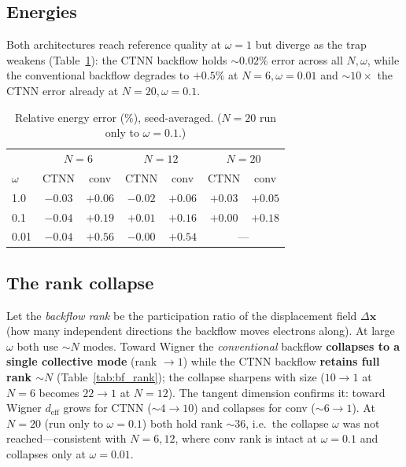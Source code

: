 \subsection{Energies}
Both architectures reach reference quality at $\omega=1$ but diverge as the trap
weakens (Table~\ref{tab:bf_energies}): the CTNN backflow holds $\sim\!0.02\%$
error across all $N,\omega$, while the conventional backflow degrades to $+0.5\%$
at $N=6,\omega=0.01$ and $\sim\!10\times$ the CTNN error already at $N=20,
\omega=0.1$.

\begin{table}[htbp]\centering
\caption{Relative energy error (\%), seed-averaged. ($N=20$ run only to
$\omega=0.1$.)}
\label{tab:bf_energies}
\begin{tabular}{l|cc|cc|cc}
\hline
 & \multicolumn{2}{c|}{$N=6$} & \multicolumn{2}{c|}{$N=12$} & \multicolumn{2}{c}{$N=20$}\\
$\omega$ & CTNN & conv & CTNN & conv & CTNN & conv \\
\hline
1.0  & $-0.03$ & $+0.06$ & $-0.02$ & $+0.06$ & $+0.03$ & $+0.05$ \\
0.1  & $-0.04$ & $+0.19$ & $+0.01$ & $+0.16$ & $+0.00$ & $+0.18$ \\
0.01 & $-0.04$ & $+0.56$ & $-0.00$ & $+0.54$ & \multicolumn{2}{c}{---}\\
\hline
\end{tabular}
\end{table}

\subsection{The rank collapse}
Let the \emph{backflow rank} be the participation ratio of the displacement field
$\Delta\mathbf{x}$ (how many independent directions the backflow moves electrons
along). At large $\omega$ both use $\sim\!N$ modes. Toward Wigner the
\emph{conventional} backflow \textbf{collapses to a single collective mode}
(rank $\to 1$) while the CTNN backflow \textbf{retains full rank $\sim\!N$}
(Table~\ref{tab:bf_rank}); the collapse sharpens with size ($10\!\to\!1$ at $N=6$
becomes $22\!\to\!1$ at $N=12$). The tangent dimension confirms it: toward Wigner
$d_{\mathrm{eff}}$ grows for CTNN ($\sim\!4\!\to\!10$) and collapses for conv
($\sim\!6\!\to\!1$). At $N=20$ (run only to $\omega=0.1$) both hold rank $\sim\!36$,
i.e.\ the collapse $\omega$ was not reached---consistent with $N=6,12$, where conv
rank is intact at $\omega=0.1$ and collapses only at $\omega=0.01$.

